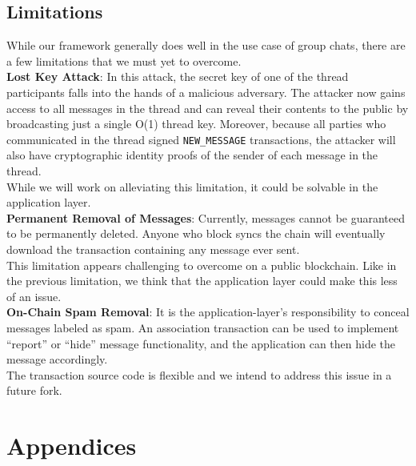 \documentclass[oneside, 12pt]{article}
\begin{document}
\subsection{Limitations}
While our framework generally does well in the use case of group chats, there are a few limitations that we must yet to overcome.\\

\noindent\textbf{Lost Key Attack}: In this attack, the secret key of one of the thread participants falls into the hands of a malicious adversary. The attacker now gains access to all messages in the thread and can reveal their contents to the public by broadcasting just a single O(1)  thread key. Moreover, because all parties who communicated in the thread signed \texttt{NEW\_MESSAGE} transactions, the attacker will also have cryptographic identity proofs of the sender of each message in the thread.\\

\noindent While we will work on alleviating this limitation, it could be solvable in the application layer.\\

\noindent \textbf{Permanent Removal of Messages}: Currently, messages cannot be guaranteed to be permanently deleted. Anyone who block syncs the chain will eventually download the transaction containing any message ever sent.\\

\noindent This limitation appears challenging to overcome on a public blockchain. Like in the previous limitation, we think that the application layer could make this less of an issue.\\

\noindent\textbf{On-Chain Spam Removal}: It is the application-layer's responsibility to conceal messages labeled as spam. An association transaction can be used to implement “report” or “hide” message functionality, and the application can then hide the message accordingly.\\

\noindent The transaction source code is flexible and we intend to address this issue in a future fork.

\section{Appendices}
\end{document}
